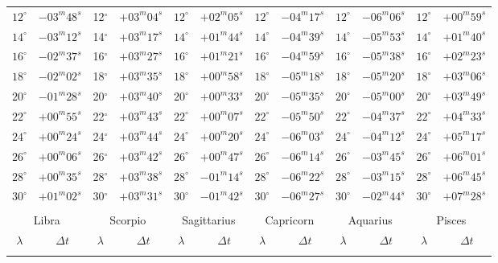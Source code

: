 \begin{table}[!h]
{\begin{tabular}{cr|cr|cr|cr|cr|cr}
$12^\circ$ & $-03^m48^s$ & 12$^\circ$ & $+03^m04^s$ & $12^\circ$ & $+02^m05^s$ & $12^\circ$ & $-04^m17^s$ & $12^\circ$ & $-06^m06^s$ & $12^\circ$ & $+00^m59^s$\\
$14^\circ$ & $-03^m12^s$ & 14$^\circ$ & $+03^m17^s$ & $14^\circ$ & $+01^m44^s$ & $14^\circ$ & $-04^m39^s$ & $14^\circ$ & $-05^m53^s$ & $14^\circ$ & $+01^m40^s$\\
$16^\circ$ & $-02^m37^s$ & 16$^\circ$ & $+03^m27^s$ & $16^\circ$ & $+01^m21^s$ & $16^\circ$ & $-04^m59^s$ & $16^\circ$ & $-05^m38^s$ & $16^\circ$ & $+02^m23^s$\\
$18^\circ$ & $-02^m02^s$ & 18$^\circ$ & $+03^m35^s$ & $18^\circ$ & $+00^m58^s$ & $18^\circ$ & $-05^m18^s$ & $18^\circ$ & $-05^m20^s$ & $18^\circ$ & $+03^m06^s$\\
$20^\circ$ & $-01^m28^s$ & 20$^\circ$ & $+03^m40^s$ & $20^\circ$ & $+00^m33^s$ & $20^\circ$ & $-05^m35^s$ & $20^\circ$ & $-05^m00^s$ & $20^\circ$ & $+03^m49^s$\\
$22^\circ$ & $+00^m55^s$ & 22$^\circ$ & $+03^m43^s$ & $22^\circ$ & $+00^m07^s$ & $22^\circ$ & $-05^m50^s$ & $22^\circ$ & $-04^m37^s$ & $22^\circ$ & $+04^m33^s$\\
$24^\circ$ & $+00^m24^s$ & 24$^\circ$ & $+03^m44^s$ & $24^\circ$ & $+00^m20^s$ & $24^\circ$ & $-06^m03^s$ & $24^\circ$ & $-04^m12^s$ & $24^\circ$ & $+05^m17^s$\\
$26^\circ$ & $+00^m06^s$ & 26$^\circ$ & $+03^m42^s$ & $26^\circ$ & $+00^m47^s$ & $26^\circ$ & $-06^m14^s$ & $26^\circ$ & $-03^m45^s$ & $26^\circ$ & $+06^m01^s$\\
$28^\circ$ & $+00^m35^s$ & 28$^\circ$ & $+03^m38^s$ & $28^\circ$ & $-01^m14^s$ & $28^\circ$ & $-06^m22^s$ & $28^\circ$ & $-03^m15^s$ & $28^\circ$ & $+06^m45^s$\\
$30^\circ$ & $+01^m02^s$ & 30$^\circ$ & $+03^m31^s$ & $30^\circ$ & $-01^m42^s$ & $30^\circ$ & $-06^m27^s$ & $30^\circ$ & $-02^m44^s$ & $30^\circ$ & $+07^m28^s$\\
\multicolumn{12}{c}{}\\
\multicolumn{2}{c}{Libra}\vline & \multicolumn{2}{c}{Scorpio} \vline& \multicolumn{2}{c}{Sagittarius} \vline& \multicolumn{2}{c}{Capricorn}\vline &
\multicolumn{2}{c}{Aquarius}\vline & \multicolumn{2}{c}{Pisces}\\\hline
$\lambda$& $\Delta t~~~~~$& $\lambda$& $\Delta t~~~~~$& $\lambda$& $\Delta t~~~~~$& $\lambda$& $\Delta t~~~~~$& $\lambda$& $\Delta t~~~~~$& $\lambda$& $\Delta t~~~~~$\\\hline
&&&&&&&&&&&\\[-2ex]

\end{tabular}}
\end{table}
